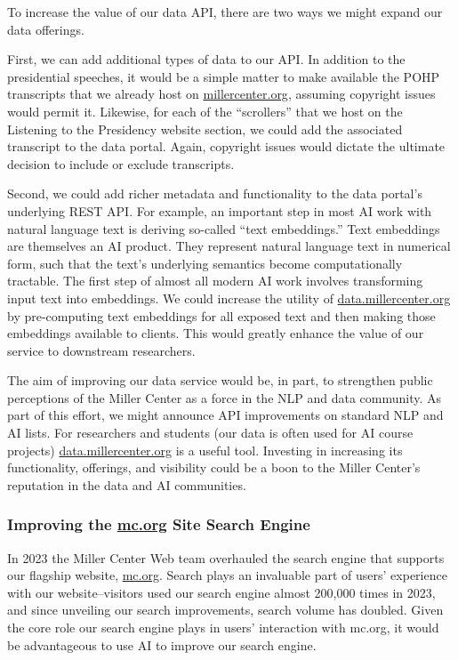 \documentclass[12pt, oneside]{article}   	%
\begin{document}
To increase the value of our data API, there are two ways we might expand our data offerings.  

First, we can add additional types of data to our API.  In addition to the presidential speeches, it would be a simple matter to make available the POHP transcripts that we already host on  \href{https://millercenter.org}{millercenter.org}, assuming copyright issues would permit it.  Likewise, for each of the “scrollers” that we host on the Listening to the Presidency website section, we could add the associated transcript to the data portal.   Again, copyright issues would dictate the ultimate decision to include or exclude transcripts. 

Second, we could add richer metadata and functionality to the data portal’s underlying REST API.  For example, an important step in most AI work with natural language text is deriving so-called “text embeddings.”  Text embeddings are themselves an AI product.  They represent natural language text in numerical form, such that the text’s underlying semantics become computationally tractable.  The first step of almost all modern AI work involves transforming input text into embeddings.  We could increase the utility of  \href{https://datamillercenter.org}{data.millercenter.org} by pre-computing text embeddings for all exposed text and then making those embeddings available to clients.  This would greatly enhance the value of our service to downstream researchers.  

The aim of improving our data service would be, in part, to strengthen public perceptions of the Miller Center as a force in the NLP and data community.  As part of this effort, we might announce API improvements on standard NLP and AI lists.  For researchers and students (our data is often used for AI course projects) \href{https://data.millercenter.org}{data.millercenter.org} is a useful tool.  Investing in increasing its functionality, offerings, and visibility could be a boon to the Miller Center's reputation in the data and AI communities.



\subsubsection{Improving the \href{https://millercenter.org}{mc.org} Site Search Engine}\label{section.applications.easy.sitesearch}
In 2023 the Miller Center Web team overhauled the search engine that supports our flagship website, \href{https://millercenter.org}{mc.org}.  Search plays an invaluable part of users' experience with our website--visitors used our search engine almost 200,000 times in 2023, and since unveiling our search improvements, search volume has doubled.  Given the core role our search engine plays in users' interaction with mc.org, it would be advantageous to use AI to improve our search engine.
\end{document}
